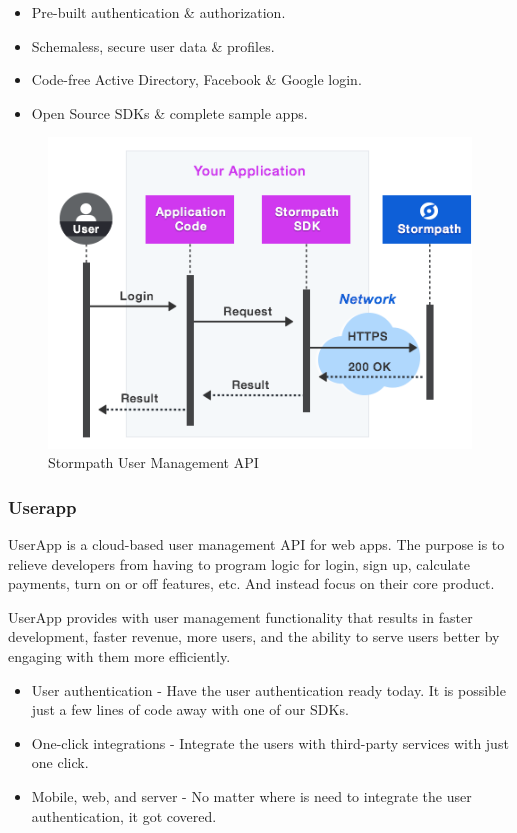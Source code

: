 \begin{itemize}
\item Pre-built authentication \& authorization.
\item Schemaless, secure user data \& profiles.
\item Code-free Active Directory, Facebook \& Google login.
\item Open Source SDKs \& complete sample apps.
\end{itemize}

\begin {figure}[h]
\graphicspath{{images/chapter_USR/}}
\includegraphics[width=\textwidth]{stormpath}
\caption{Stormpath User Management API}
\end {figure}

\subsubsection{Userapp}

UserApp is a cloud-based user management API for web apps. The purpose is to relieve developers from having to program logic for login, sign up, calculate payments, turn on or off features, etc. And instead focus on their core product.

UserApp provides with user management functionality that results in faster development, faster revenue, more users, and the ability to serve users better by engaging with them more efficiently.\cite{usr_userapp}

\begin{itemize}
\item User authentication - Have the user authentication ready today. It is possible just a few lines of code away with one of our SDKs.
\item One-click integrations - Integrate the users with third-party services with just one click.
\item Mobile, web, and server - No matter where is need to integrate the user authentication, it got  covered.
\end{itemize}

